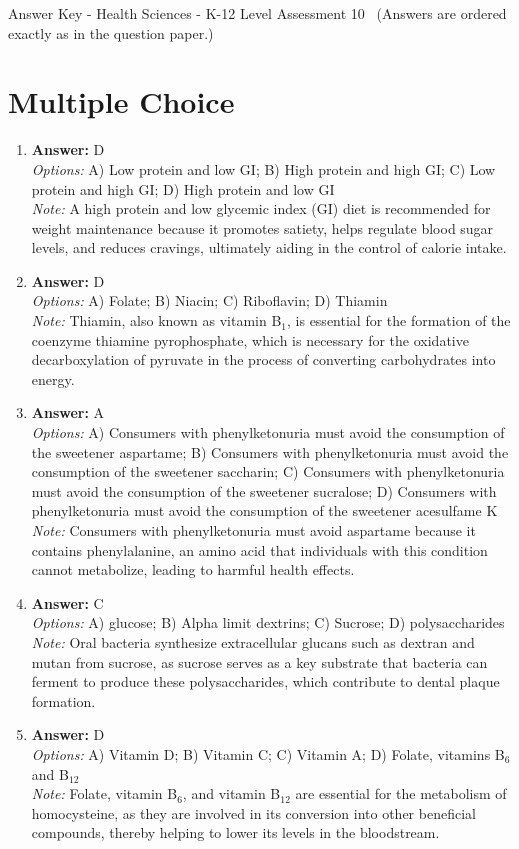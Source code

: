 \documentclass[12pt]{article}
\begin{document}
\begin{center}
Answer Key - Health Sciences - K-12 Level Assessment 10 \
\small (Answers are ordered exactly as in the question paper.)
\end{center}

\section*{Multiple Choice}
\begin{enumerate}[label=\arabic*.]
\item \textbf{Answer:} D
\\ \textit{Options:} A) Low protein and low GI; B) High protein and high GI; C) Low protein and high GI; D) High protein and low GI
\\ \textit{Note:} A high protein and low glycemic index (GI) diet is recommended for weight maintenance because it promotes satiety, helps regulate blood sugar levels, and reduces cravings, ultimately aiding in the control of calorie intake.
\item \textbf{Answer:} D
\\ \textit{Options:} A) Folate; B) Niacin; C) Riboflavin; D) Thiamin
\\ \textit{Note:} Thiamin, also known as vitamin B$_{1}$, is essential for the formation of the coenzyme thiamine pyrophosphate, which is necessary for the oxidative decarboxylation of pyruvate in the process of converting carbohydrates into energy.
\item \textbf{Answer:} A
\\ \textit{Options:} A) Consumers with phenylketonuria must avoid the consumption of the sweetener aspartame; B) Consumers with phenylketonuria must avoid the consumption of the sweetener saccharin; C) Consumers with phenylketonuria must avoid the consumption of the sweetener sucralose; D) Consumers with phenylketonuria must avoid the consumption of the sweetener acesulfame K
\\ \textit{Note:} Consumers with phenylketonuria must avoid aspartame because it contains phenylalanine, an amino acid that individuals with this condition cannot metabolize, leading to harmful health effects.
\item \textbf{Answer:} C
\\ \textit{Options:} A) glucose; B) Alpha limit dextrins; C) Sucrose; D) polysaccharides
\\ \textit{Note:} Oral bacteria synthesize extracellular glucans such as dextran and mutan from sucrose, as sucrose serves as a key substrate that bacteria can ferment to produce these polysaccharides, which contribute to dental plaque formation.
\item \textbf{Answer:} D
\\ \textit{Options:} A) Vitamin D; B) Vitamin C; C) Vitamin A; D) Folate, vitamins B$_{6}$ and B$_{12}$
\\ \textit{Note:} Folate, vitamin B$_{6}$, and vitamin B$_{12}$ are essential for the metabolism of homocysteine, as they are involved in its conversion into other beneficial compounds, thereby helping to lower its levels in the bloodstream.
\end{enumerate}
\end{document}
